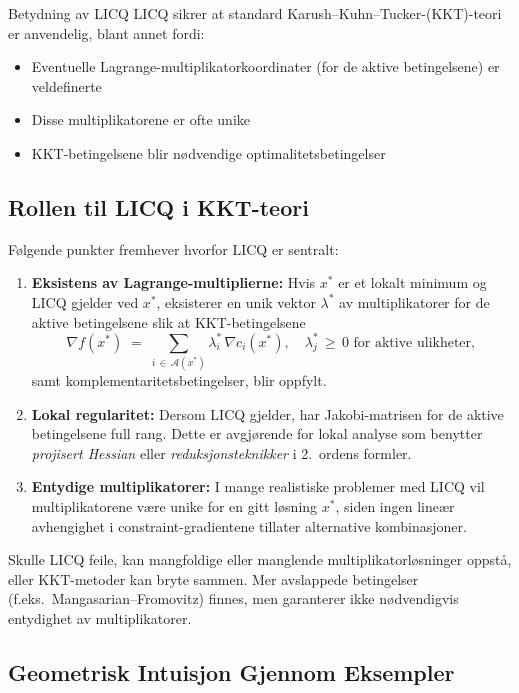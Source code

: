\begin{remark}{Betydning av LICQ}{}
	LICQ sikrer at standard Karush--Kuhn--Tucker-(KKT)-teori er anvendelig, blant annet fordi:
	\begin{itemize}
		\item Eventuelle Lagrange-multiplikatorkoordinater (for de aktive betingelsene) er veldefinerte
		\item Disse multiplikatorene er ofte unike
		\item KKT-betingelsene blir nødvendige optimalitetsbetingelser
	\end{itemize}
\end{remark}

\subsection{Rollen til LICQ i KKT-teori}

Følgende punkter fremhever hvorfor LICQ er sentralt:
\begin{enumerate}
	\item \textbf{Eksistens av Lagrange-multiplierne:} Hvis \(x^*\) er et lokalt minimum og LICQ gjelder ved \(x^*\), eksisterer en unik vektor \(\lambda^*\) av multiplikatorer for de aktive betingelsene slik at KKT-betingelsene
	      \[
		      \nabla f(x^*) \;=\; \sum_{i \,\in\, \mathcal{A}(x^*)}\!\lambda_i^*\,\nabla c_i(x^*),\quad
		      \lambda_j^* \,\ge\,0 \text{ for aktive ulikheter},
	      \]
	      samt komplementaritetsbetingelser, blir oppfylt.
	\item \textbf{Lokal regularitet:} Dersom LICQ gjelder, har Jakobi-matrisen for de aktive betingelsene full rang. Dette er avgjørende for lokal analyse som benytter \emph{projisert Hessian} eller \emph{reduksjonsteknikker} i 2.~ordens formler.
	\item \textbf{Entydige multiplikatorer:} I mange realistiske problemer med LICQ vil multiplikatorene være unike for en gitt løsning \(x^*\), siden ingen lineær avhengighet i constraint-gradientene tillater alternative kombinasjoner.
\end{enumerate}
Skulle LICQ feile, kan mangfoldige eller manglende multiplikatorløsninger oppstå, eller KKT-metoder kan bryte sammen. Mer avslappede betingelser (f.eks.\ Mangasarian--Fromovitz) finnes, men garanterer ikke nødvendigvis entydighet av multiplikatorer.

\subsection{Geometrisk Intuisjon Gjennom Eksempler}


